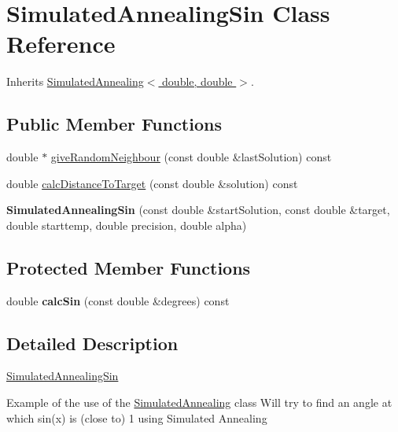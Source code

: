 \hypertarget{class_simulated_annealing_sin}{
\section{SimulatedAnnealingSin Class Reference}
\label{class_simulated_annealing_sin}
}


Inherits \hyperlink{class_simulated_annealing}{SimulatedAnnealing$<$ double, double $>$}.\subsection*{Public Member Functions}
\begin{DoxyCompactItemize}
\item 
double $\ast$ \hyperlink{class_simulated_annealing_sin_acd5444d158d2877c3d95472cdb8b5297}{giveRandomNeighbour} (const double \&lastSolution) const 
\item 
double \hyperlink{class_simulated_annealing_sin_a064890c05ac35e04b71ce6a1405f1e36}{calcDistanceToTarget} (const double \&solution) const 
\item 
\hypertarget{class_simulated_annealing_sin_a7eb83c4051cf9a997145c0c529118eac}{
{\bfseries SimulatedAnnealingSin} (const double \&startSolution, const double \&target, double starttemp, double precision, double alpha)}
\label{class_simulated_annealing_sin_a7eb83c4051cf9a997145c0c529118eac}

\end{DoxyCompactItemize}
\subsection*{Protected Member Functions}
\begin{DoxyCompactItemize}
\item 
\hypertarget{class_simulated_annealing_sin_abaa532defdaef7ae4952040621b52e6d}{
double {\bfseries calcSin} (const double \&degrees) const }
\label{class_simulated_annealing_sin_abaa532defdaef7ae4952040621b52e6d}

\end{DoxyCompactItemize}


\subsection{Detailed Description}
\hyperlink{class_simulated_annealing_sin}{SimulatedAnnealingSin}

Example of the use of the \hyperlink{class_simulated_annealing}{SimulatedAnnealing} class Will try to find an angle at which sin(x) is (close to) 1 using Simulated Annealing 

